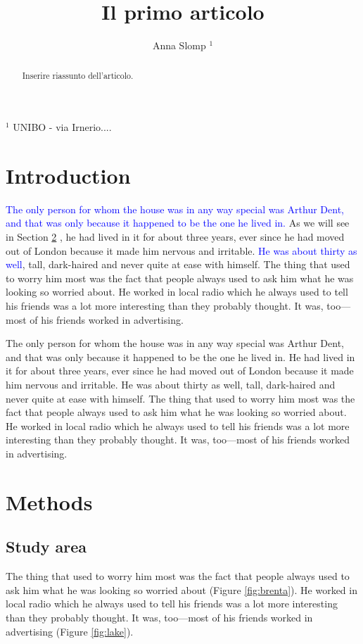 \documentclass[a4paper, 12pt]{article}
\title{Il primo articolo}
\author{Anna Slomp $^1$} %
\newcommand{\tb}{\textcolor{blue}}
\begin{document}
\maketitle

$^1$ UNIBO - via Irnerio....  %

\tableofcontents %

\begin{abstract}
Inserire riassunto dell'articolo.
\end{abstract}

\section{Introduction} %
\tb {The only person for whom the house was in any way special was Arthur Dent, and that was only because it happened to be the one he lived in.} As we will see in Section \ref{sec:methods} %
, he had lived in it for about three years, ever since he had moved out of London because it made him nervous and irritable. \tb{He was about thirty as well}, tall, dark-haired and never quite at ease with himself. The thing that used to worry him most was the fact that people always used to ask him what he was looking so worried about. He worked in local radio which he always used to tell his friends was a lot more interesting than they probably thought. It was, too—most of his friends worked in advertising.

The only person for whom the house was in any way special was Arthur Dent, and that was only because it happened to be the one he lived in. He had lived in it for about three years, ever since he had moved out of London because it made him nervous and irritable. He was about thirty as well, tall, dark-haired and never quite at ease with himself. The thing that used to worry him most was the fact that people always used to ask him what he was looking so worried about. He worked in local radio which he always used to tell his friends was a lot more interesting than they probably thought. It was, too—most of his friends worked in advertising.

\section{Methods}\label{sec:methods} %
\subsection{Study area} %
The thing that used to worry him most was the fact that people always used to ask him what he was looking so worried about (Figure \ref{fig:brenta}). He worked in local radio which he always used to tell his friends was a lot more interesting than they probably thought. It was, too—most of his friends worked in advertising (Figure \ref{fig:lake}).
\end{document}
